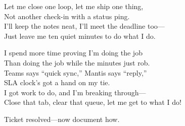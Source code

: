 \begin{lyrics}
Let me close one loop, let me ship one thing,\\
Not another check-in with a status ping.\\
I’ll keep the notes neat, I’ll meet the deadline too—\\
Just leave me ten quiet minutes to do what I do.

I spend more time proving I’m doing the job\\
Than doing the job while the minutes just rob.\\
Teams says “quick sync,” Mantis says “reply,”\\
SLA clock’s got a hand on my tie.\\
I got work to do, and I’m breaking through—\\
Close that tab, clear that queue, let me get to what I do!

Ticket resolved—now document how.
\end{lyrics}

